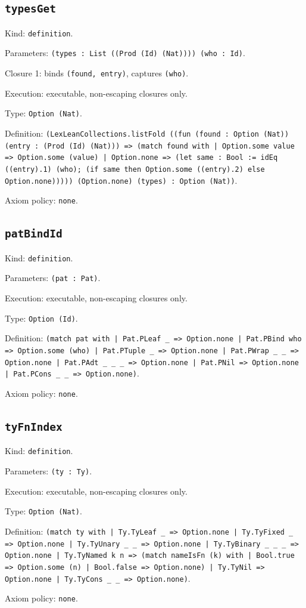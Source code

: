 \documentclass[11pt]{article}
\begin{document}
\subsection*{\texttt{typesGet}}
\noindent Kind: \texttt{definition}.\par
\noindent Parameters: \texttt{(types : List ((Prod (Id) (Nat)))) (who : Id)}.\par
\noindent Closure 1: binds \texttt{(found, entry)}, captures \texttt{(who)}.\par
\noindent Execution: executable, non-escaping closures only.\par
\noindent Type: \texttt{Option (Nat)}.\par
\noindent Definition: \texttt{(LexLeanCollections.listFold ((fun (found : Option (Nat)) (entry : (Prod (Id) (Nat))) => (match found with | Option.some value => Option.some (value) | Option.none => (let same : Bool := idEq ((entry).1) (who); (if same then Option.some ((entry).2) else Option.none))))) (Option.none) (types) : Option (Nat))}.\par
\noindent Axiom policy: \texttt{none}.\par
\subsection*{\texttt{patBindId}}
\noindent Kind: \texttt{definition}.\par
\noindent Parameters: \texttt{(pat : Pat)}.\par
\noindent Execution: executable, non-escaping closures only.\par
\noindent Type: \texttt{Option (Id)}.\par
\noindent Definition: \texttt{(match pat with | Pat.PLeaf \_ => Option.none | Pat.PBind who => Option.some (who) | Pat.PTuple \_ => Option.none | Pat.PWrap \_ \_ => Option.none | Pat.PAdt \_ \_ \_ => Option.none | Pat.PNil => Option.none | Pat.PCons \_ \_ => Option.none)}.\par
\noindent Axiom policy: \texttt{none}.\par
\subsection*{\texttt{tyFnIndex}}
\noindent Kind: \texttt{definition}.\par
\noindent Parameters: \texttt{(ty : Ty)}.\par
\noindent Execution: executable, non-escaping closures only.\par
\noindent Type: \texttt{Option (Nat)}.\par
\noindent Definition: \texttt{(match ty with | Ty.TyLeaf \_ => Option.none | Ty.TyFixed \_ => Option.none | Ty.TyUnary \_ \_ => Option.none | Ty.TyBinary \_ \_ \_ => Option.none | Ty.TyNamed k n => (match nameIsFn (k) with | Bool.true => Option.some (n) | Bool.false => Option.none) | Ty.TyNil => Option.none | Ty.TyCons \_ \_ => Option.none)}.\par
\noindent Axiom policy: \texttt{none}.\par
\end{document}
